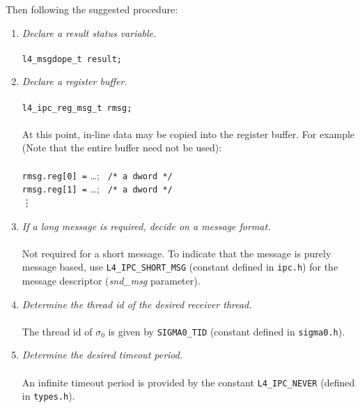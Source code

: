 Then following the suggested procedure:

\begin{enumerate}

\item \emph{Declare a result status variable.} \\ \\
  \hspace*{20pt} {\footnotesize\verb+l4_msgdope_t result;+}

\item \emph{Declare a register buffer.} \\ \\
  \hspace*{20pt} {\footnotesize\verb+l4_ipc_reg_msg_t rmsg;+} \\ \\
  \hspace*{10pt} At this point, in-line data may be copied into the 
  register buffer. For example (Note that the entire buffer need not 
  be used): \\ \\
  \hspace*{20pt} {\footnotesize\verb+rmsg.reg[0] =+} \ldots; {\footnotesize\verb+ /* a dword */+} \\
  \hspace*{20pt} {\footnotesize\verb+rmsg.reg[1] =+} \ldots; {\footnotesize\verb+ /* a dword */+} \\
  \hspace*{50pt} \vdots

\item \emph{If a long message is required, decide on a message format.}
  \\ \\ \hspace*{10pt}
  Not required for a short message. To indicate that the message is 
  purely message based, use {\footnotesize\verb+L4_IPC_SHORT_MSG+} (constant defined in
  {\footnotesize\verb+ipc.h+}) for the message descriptor (\emph{snd\_msg} parameter).

\item \emph{Determine the thread id of the desired receiver thread.} \\
  \\ \hspace*{10pt}
  The thread id of $\sigma_0$ is given by {\footnotesize\verb+SIGMA0_TID+} 
  (constant defined in {\footnotesize\verb+sigma0.h+}).
  
\item \emph{Determine the desired timeout period.} \\ \\ \hspace*{10pt}
  An infinite timeout period is provided by the constant 
  {\footnotesize\verb+L4_IPC_NEVER+} (defined in {\footnotesize\verb+types.h+}). 
  

\end{enumerate}
